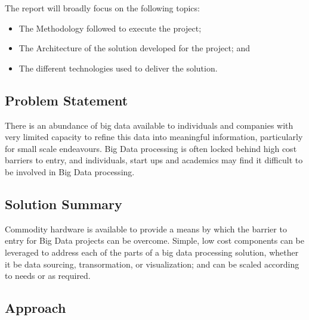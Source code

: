 \documentclass[12pt]{article} %
\begin{document}
The report will broadly focus on the following topics:

\begin{itemize}
	\item The Methodology followed to execute the project;
	\item The Architecture of the solution developed for the project; and
	\item The different technologies used to deliver the solution.
\end{itemize}

\subsection{Problem Statement}

There is an abundance of big data available to individuals and companies with very limited capacity to refine this data into meaningful information, particularly for small scale endeavours. Big Data processing is often locked behind high cost barriers to entry, and individuals, start ups and academics may find it difficult to be involved in Big Data processing.

\subsection{Solution Summary}

Commodity hardware is available to provide a means by which the barrier to entry for Big Data projects can be overcome. Simple, low cost components can be leveraged to address each of the parts of a big data processing solution, whether it be data sourcing, transormation, or visualization; and can be scaled according to needs or as required.

\subsection{Approach}

	
		
		
\end{document}
